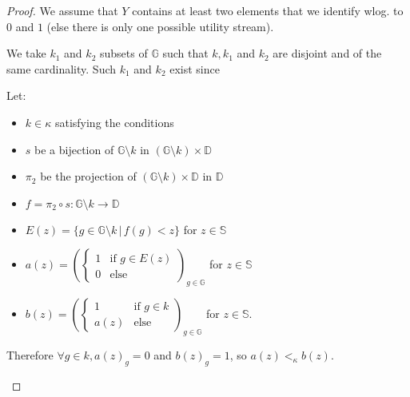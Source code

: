 \documentclass{article}
\newcommand{\G}{\mathbb{G}}
\newcommand{\D}{\mathbb{D}}
\begin{document}
\begin{proof}
  We assume that $Y$ contains at least two elements that we identify wlog. to $0$
  and $1$ (else there is only one possible utility stream).\par
  We take $k_1$ and $k_2$ subsets of $\G$ such that $k, k_1$ and $k_2$ are disjoint and
  of the same cardinality. Such $k_1$ and $k_2$ exist since 

  Let:
  \begin{itemize}
  \item $k\in\kappa$ satisfying the conditions
  \item $s$ be a bijection of $\G\setminus k$ in $(\G\setminus k)\times\D$
  \item $\pi_2$ be the projection of $(\G\setminus k)\times \D$
        in $\mathbb D$
  \item $f=\pi_2\circ s:\G\setminus k\to\D$
  \item $E(z)=\{g\in \G\setminus k\,|\, f(g)<z\}$ for $z\in\mathbb S$
  \item $\displaystyle a(z)=\left(\left\{\begin{array}{ll}1&\text{if }g\in
        E(z)\\0&\text{else}\end{array}\right.\right)_{g\in\G}$ for $z\in \mathbb S$
  \item $\displaystyle b(z)=\left(\left\{\begin{array}{ll}1&\text{if }g\in
        k\\a(z)&\text{else}\end{array}\right.\right)_{g\in\G}$ for $z\in \mathbb S$.
  \end{itemize}

  Therefore $\forall g\in k, a(z)_g=0$ and $b(z)_g=1$, so $a(z)<_\kappa b(z)$.

  \def\couleurdroite{teal!50!green!40}
  \begin{center}
\end{center}
\end{proof}
\end{document}
